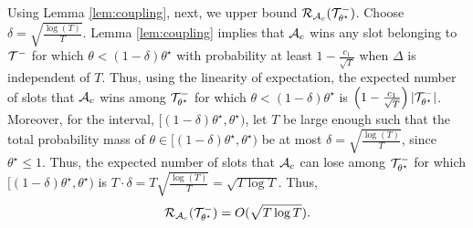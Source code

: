 Using Lemma \ref{lem:coupling}, next, we upper bound  $ \mathcal{R}_{\mathcal{A}_c}(\mathcal{T}^{-}_{\theta^\star})$.
Choose $\delta=\sqrt{\frac{\log (T)}{T}}$. Lemma \ref{lem:coupling} implies that $\mathcal{A}_c$ wins any slot belonging to $\mathcal{T}^{-}$ for which $\theta < (1-\delta)\theta^\star$ with probability at least $1-\frac{c_1}{\sqrt{T}}$ when $\Delta$ is independent of $T$.
Thus, using the linearity of expectation, the expected number of slots that $\mathcal{A}_c$ wins among $\mathcal{T}^{-}_{\theta^\star}$ for which $\theta < (1-\delta)\theta^\star$ is 
$\left(1-\frac{c_1}{\sqrt{T}}\right)|\mathcal{T}^{-}_{\theta^\star}|$. Moreover, for the interval, $[(1-\delta)\theta^\star, \theta^\star)$, let $T$ be large enough such that 
the total probability mass of $\theta \in  [(1-\delta)\theta^\star, \theta^\star)$ be at most $\delta=\sqrt{\frac{\log (T)}{T}}$, since $\theta^\star \le 1$. Thus,  
the expected number of slots that $\mathcal{A}_c$ can lose among $\mathcal{T}^{-}_{\theta^\star}$ for which $[(1-\delta)\theta^\star, \theta^\star)$ is 
$T \cdot \delta = T \sqrt{\frac{\log (T)}{T}} = \sqrt{T \log T}$.
Thus, 
\begin{equation}\label{eq:dummy11}
\mathcal{R}_{\mathcal{A}_c}(\mathcal{T}^{-}_{\theta^\star}) = O(\sqrt{T \log T}).
\end{equation}

